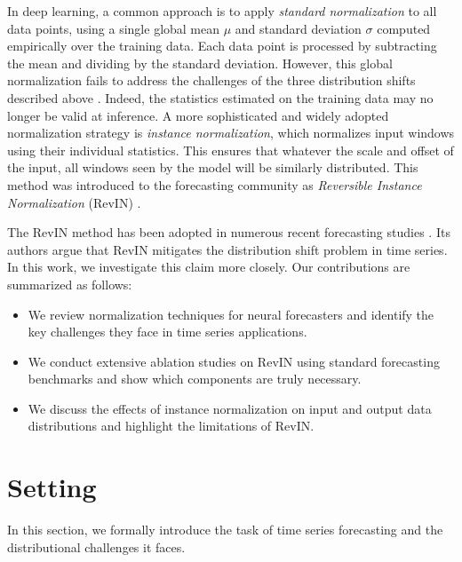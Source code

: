 


In deep learning, a common approach is to apply \textit{standard normalization} to all data points, using a single global mean $\mu$ and standard deviation $\sigma$ computed empirically over the training data. Each data point is processed by subtracting the mean and dividing by the standard deviation. However, this global normalization fails to address the challenges of the three distribution shifts
described above
\citep{adaptivenorm}. Indeed, the statistics estimated on the training data may no longer be valid at inference. A more sophisticated and widely adopted normalization strategy is \textit{instance normalization}, which normalizes input windows using their individual statistics. This ensures that whatever the scale and offset of the input, all windows seen by the model will be similarly distributed. This method was introduced to the forecasting community as \textit{Reversible Instance Normalization} (RevIN) \citep{revin}.

The RevIN method has been adopted in numerous recent forecasting studies \citep{patchtst,fits,tirex,HUANG2025114036,revin}. Its authors argue that RevIN mitigates the distribution shift problem in time series. In this work, we investigate this claim more closely.
Our contributions are summarized as follows:
\begin{itemize}
    \item We review normalization techniques for neural forecasters and identify the key challenges they face in time series applications.
    \item We conduct extensive ablation studies on RevIN using standard forecasting benchmarks and show which components are truly necessary.
    \item We discuss the effects of instance normalization on input and output data distributions and highlight the limitations of RevIN.
\end{itemize}

\newpage
\section{Setting}

In this section, we formally introduce the task of time series forecasting and the distributional challenges it faces.

